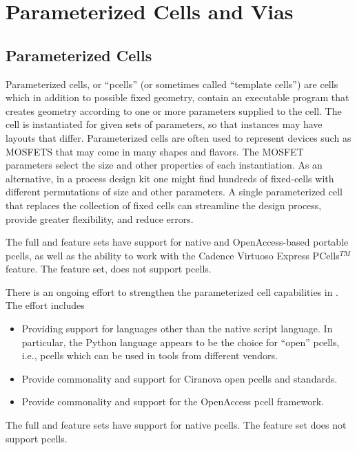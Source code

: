
\chapter{Parameterized Cells and Vias}

\section{Parameterized Cells}
\label{pcells}

Parameterized cells, or ``pcells'' (or sometimes called ``template
cells'') are cells which in addition to possible fixed geometry,
contain an executable program that creates geometry according to one
or more parameters supplied to the cell.  The cell is instantiated for
given sets of parameters, so that instances may have layouts that
differ.  Parameterized cells are often used to represent devices such
as MOSFETS that may come in many shapes and flavors.  The MOSFET
parameters select the size and other properties of each instantiation. 
As an alternative, in a process design kit one might find hundreds of
fixed-cells with different permutations of size and other parameters. 
A single parameterized cell that replaces the collection of fixed
cells can streamline the design process, provide greater flexibility,
and reduce errors.

\ifoa
The full and {\XicII} feature sets have support for native and
OpenAccess-based portable pcells, as well as the ability to work with
the Cadence Virtuoso Express PCells$^{TM}$ feature.  The {\Xiv}
feature set, does not support pcells.

There is an ongoing effort to strengthen the parameterized
cell capabilities in {\Xic}.  The effort includes
\begin{itemize}
\item{Providing support for languages other than the native script
language.  In particular, the Python language appears to be the choice
for ``open'' pcells, i.e., pcells which can be used in tools from
different vendors.}

\item{Provide commonality and support for Ciranova open pcells and
standards.}

\item{Provide commonality and support for the OpenAccess pcell
framework.}
\end{itemize}
\else
The full and {\XicII} feature sets have support for native pcells.  The
{\Xiv} feature set does not support pcells.

